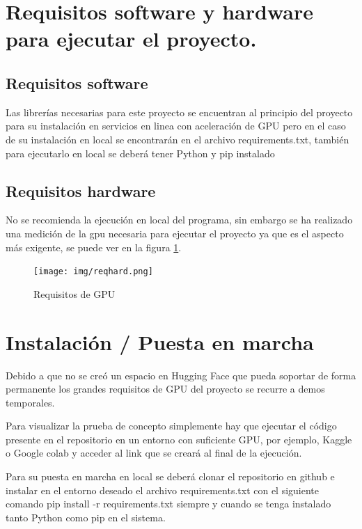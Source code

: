 
\section{Requisitos software y hardware para ejecutar el proyecto.}

\subsection{Requisitos software}

Las librerías necesarias para este proyecto se encuentran al principio del proyecto para su instalación en servicios en linea con aceleración de GPU pero en el caso de su instalación en local se encontrarán en el archivo requirements.txt, también para ejecutarlo en local se deberá tener Python y pip instalado %

\subsection{Requisitos hardware}

No se recomienda la ejecución en local del programa, sin embargo se ha realizado una medición de la gpu necesaria para ejecutar el proyecto ya que es el aspecto más exigente, se puede ver en la figura \ref{fig:hardware}.


\begin{figure}[h!]
    \centering
    \texttt{[image: img/reqhard.png]}
    \caption{Requisitos de GPU}
    \label{fig:hardware}
\end{figure}

\section{Instalación / Puesta en marcha}

Debido a que no se creó un espacio en Hugging Face que pueda soportar de forma permanente los grandes requisitos de GPU del proyecto se recurre a demos temporales.

Para visualizar la prueba de concepto simplemente hay que ejecutar el código presente en el repositorio en un entorno con suficiente GPU, por ejemplo, Kaggle o Google colab y acceder al link que se creará al final de la ejecución.

Para su puesta en marcha en local se deberá clonar el repositorio en github e instalar en el entorno deseado el archivo requirements.txt con el siguiente comando pip install -r requirements.txt siempre y cuando se tenga instalado tanto Python como pip en el sistema.



